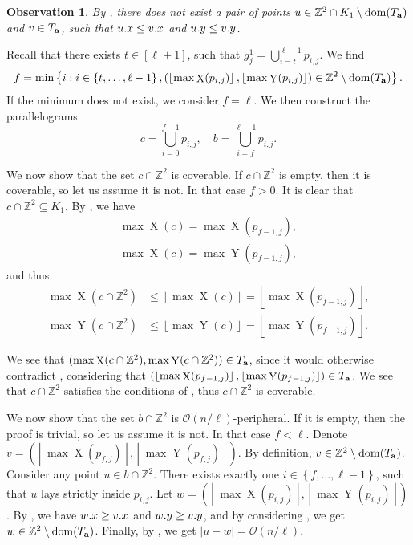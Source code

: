\documentclass[11pt]{article}
\newcommand{\Z}{\mathbb{Z}}
\renewcommand{\O}{\mathcal{O}}
\newcommand{\set}[1]{\left\lbrace #1 \right\rbrace}
\newcommand{\floor}[1]{\left\lfloor #1 \right\rfloor}
\newcommand{\eq}[1]{\begin{align*} #1 \end{align*}}
\theoremstyle{plain}
\newtheorem{observation}{Observation}
\theoremstyle{definition}
\theoremstyle{remark}
\DeclareMathOperator*{\X}{X}
\DeclareMathOperator*{\Y}{Y}
\begin{document}
\begin{observation}\label{domination_lemma}
	By , there does not exist a pair of points $u \in \Z^2 \cap K_1 \setminus \d{\Ta}$ and $v \in T_\mathbf{a}$, such that $u.x \le v.x$ and $u.y \le v.y$. 
\end{observation}


Recall that there exists $t \in [\ell + 1]$, such that
$ g^1_j = \bigcup_{i = t}^{\ell - 1} p_{i, j}.$
We find 
$$ f = \min\set{i : i \in \set{t, \dots, \ell - 1}, (\floor{\max \X(p_{i, j})}, \floor{\max \Y(p_{i, j})}) \in \Z^2 \setminus \d{\Ta}}.$$
If the minimum does not exist, we consider $f = \ell$.
We then construct the parallelograms
$$c = \bigcup_{i = 0}^{f - 1} p_{i, j}, \quad b = \bigcup_{i = f}^{\ell - 1} p_{i, j}.$$

We now show that the set $c \cap \Z^2$ is coverable.
If $c \cap \Z^2$ is empty, then it is coverable, so let us assume it is not.
In that case $f > 0$.
It is clear that $c \cap \Z^2 \subseteq K_1$.
By , we have 
\eq{
\max \X(c) = \max \X(p_{f - 1, j}), \\
\max \X(c) = \max \Y(p_{f - 1, j}),
}
and thus
\eq{
	\max \X(c \cap \Z^2) &\le \floor{\max \X(c)} = \floor{\max \X(p_{f - 1, j})}, \\
	\max \Y(c \cap \Z^2) &\le \floor{\max \Y(c)} = \floor{\max \Y(p_{f - 1, j})}.
}

We see that $(\max \X(c \cap \Z^2), \max \Y(c \cap \Z^2)) \in \Ta$, since it would otherwise contradict ,
considering that
$(\floor{\max \X(p_{f - 1, j})}, \floor{\max \Y(p_{f - 1, j})}) \in \Ta$.
We see that $c \cap \Z^2$ satisfies the conditions of , thus $c \cap \Z^2$ is coverable.

We now show that the set $b \cap \Z^2$ is $\O(n / \ell)$-peripheral.
If it is empty, then the proof is trivial, so let us assume it is not.
In that case $f < \ell$.
Denote $v = (\floor{\max \X(p_{f, j})}, \floor{\max \Y(p_{f, j})})$.
By definition, $v \in \Z^2 \setminus \d{\Ta}$.
Consider any point $u \in b \cap \Z^2$.
There exists exactly one $i \in \set{f, \dots, \ell - 1}$, such that $u$ lays strictly inside $p_{i, j}$.
Let $w = (\floor{\max \X(p_{i, j})}, \floor{\max \Y(p_{i, j})})$.
By , we have $w.x \ge v.x$ and $w.y \ge v.y$, and by considering ,
we get $w \in \Z^2 \setminus \d{\Ta}$.
Finally, by , we get $|u - w| = \O(n / \ell)$.
\end{document}
